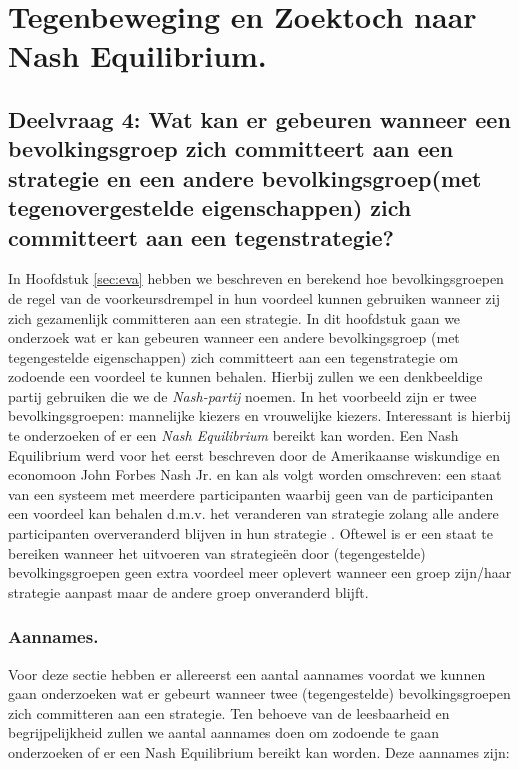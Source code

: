 \newpage
\section{Tegenbeweging en Zoektoch naar Nash Equilibrium.}
\label{h7}

\subsection*{Deelvraag 4: Wat kan er gebeuren wanneer een bevolkingsgroep zich committeert aan een strategie en een andere bevolkingsgroep(met tegenovergestelde eigenschappen) zich committeert aan een tegenstrategie?}


In Hoofdstuk \ref{sec:eva} hebben we beschreven en berekend hoe bevolkingsgroepen de regel van de voorkeursdrempel in hun voordeel kunnen gebruiken wanneer zij zich gezamenlijk committeren aan een strategie. In dit hoofdstuk gaan we onderzoek wat er kan gebeuren wanneer een andere bevolkingsgroep (met tegengestelde eigenschappen) zich committeert aan een tegenstrategie om zodoende een voordeel te kunnen behalen. Hierbij zullen we een denkbeeldige partij gebruiken die we de \textit{Nash-partij} noemen. In het voorbeeld zijn er twee bevolkingsgroepen: mannelijke kiezers en vrouwelijke kiezers. Interessant is hierbij te onderzoeken of er een \textit{Nash Equilibrium} bereikt kan worden. Een Nash Equilibrium werd voor het eerst beschreven door de Amerikaanse wiskundige en economoon John Forbes Nash Jr. \cite{nash1950equilibrium} en kan als volgt worden omschreven: een staat van een systeem met meerdere participanten waarbij geen van de participanten een voordeel kan behalen d.m.v. het veranderen van strategie zolang alle andere participanten oververanderd blijven in hun strategie \citep{christiansen2016neuroeconomics, nashprinceton}. Oftewel is er een staat te bereiken wanneer het uitvoeren van strategie\"{e}n door (tegengestelde) bevolkingsgroepen geen extra voordeel meer oplevert wanneer een groep zijn/haar strategie aanpast maar de andere groep onveranderd blijft. 

\subsubsection*{Aannames.} \label{aannamesNash}
Voor deze sectie hebben er allereerst een aantal aannames voordat we kunnen gaan onderzoeken wat er gebeurt wanneer twee (tegengestelde) bevolkingsgroepen zich committeren aan een strategie. Ten behoeve van de leesbaarheid en begrijpelijkheid zullen  we aantal aannames doen om zodoende te gaan onderzoeken of er een Nash Equilibrium bereikt kan worden. Deze aannames zijn:

